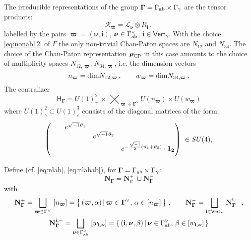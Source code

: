 \documentclass[12pt]{amsart}
\newcommand {\3}{\underline{\bf 3}}
\newcommand {\4}{\underline{\bf 4}}
\newcommand {\6}{\underline{\bf 6}}
\newcommand{\beq}{\begin{equation}}
\newcommand{\eeq}{\end{equation}}
\newcommand {\bN}   {\mathbf{N}}
\newcommand {\ib} {\mathbf{i}}
\newcommand {\Hf} {\mathsf{H}}
\newcommand {\bnu} {{\boldsymbol{\nu}}}
\newcommand {\bro} {{\boldsymbol{\rho}}}
\newcommand {\bom} {{\boldsymbol{\varpi}}}
\newcommand {\CalL} {\mathcal L}
\newcommand {\CalR} {\mathcal R}
\newcommand{\ve}{\varepsilon}
\newcommand{\Gammadi}{\boldsymbol{\Gamma}}
\newcommand{\Gamab}{{\Gamma}_{\rm ab}}
\newcommand{\Gamav}{{\Gamma}^{\vee}_{\rm ab}}
\newcommand{\Vg}{\mathsf{Vert}_{\gamma}}
\begin{document}
\begin{enumerate}
The irreducible representations of the group $\Gammadi = {\Gamab} \times {\Gamma}_{\gamma}$ are the tensor products:
\beq
{\CalR}_{\bom} = {\CalL}_{\bnu} \otimes R_{\ib}  \, , 
\eeq
 labelled by the pairs ${\bom} = ({\bnu}, {\ib})$, ${\bnu} \in {\Gamav}$, ${\ib} \in {\Vg}$.
With the choice \eqref{eq:nonab12} of $\Gamma$ the only non-trivial Chan-Paton spaces are $N_{12}$ and $N_{34}$. The choice of the Chan-Paton representation ${\bro}_{\rm CP}$  in this case amounts to the choice of multiplicity spaces $N_{12,   \bom}, N_{34,   \bom}$, i.e. the dimension vectors
\beq
n_{\bom} = {\rm dim} N_{12, \bom}\, , \qquad
w_{\bom} = {\rm dim} N_{34,  \bom} \, , 
\eeq
The centralizer 
\beq
{\Hf}_{\Gammadi} = U(1)^{2}_{\gamma} \ \times \ \varprod_{{\bom} \in {\Gammadi}^{\vee}} U(n_{\bom}) \times  U(w_{\bom})
\label{eq:centra1234}
\eeq
where $U(1)^2_{\gamma} \subset U(1)^{3}_{\ve}$ consists of the diagonal matrices of the form:
\beq
 \left(  \begin{matrix} & \begin{matrix} & e^{\sqrt{-1}{\vartheta}_{1}} & \\
& &  e^{\sqrt{-1}{\vartheta}_{2}} \end{matrix}  &   \begin{matrix} &  & \\
& &   \end{matrix} \\
&  \begin{matrix} &  & \\
& &   \end{matrix} &  e^{-\frac{\sqrt{-1}}{2} \left( {\vartheta}_{1} + {\vartheta}_{2} \right)} \cdot {\bf 1}_{\bf 2} \end{matrix}  \right) \  \in SU(4)  , 
\eeq 

Define (cf. \eqref{eq:nlab}, \eqref{eq:nlabab}), for ${\Gammadi}= {\Gamab} \times {\Gamma}_{\gamma}$:
\beq
{\bN}_{\Gammadi} = {\bN}_{\Gammadi}^{+} \ \sqcup {\bN}_{\Gammadi}^{-}
\label{eq:nlababale}
\eeq
with
\begin{multline}
 {\bN}_{\Gammadi}^{+} =  \bigsqcup_{{\bom} \in {\Gammadi}^{\vee}}\ [n_{\bom}] = \left\{ \, ({\bom}, {\alpha}) \, | \,  {\bom} \in {\Gammadi}^{\vee}, \, {\alpha} \in [n_{{\bom}}] \, \right\}  \, , \qquad 
 {\bN}_{\Gammadi}^{-} =  \bigsqcup\limits_{\ib \in \Vg} \, {\bN}_{\Gammadi}^{{\ib}, -} \, , \\
  {\bN}_{\Gammadi}^{{\ib}, -} =  \bigsqcup_{{\bnu} \in {\Gamav}}\ [w_{{\ib}, \bnu}] = \left\{ \, ({\ib}, {\bnu}, {\beta}) \, | \,  {\bnu} \in {\Gamav}, \, {\beta} \in [w_{{\ib}, {\bnu}}] \, \right\} \\
\label{eq:nlababale2}
\end{multline}




\end{enumerate}
\end{document}
